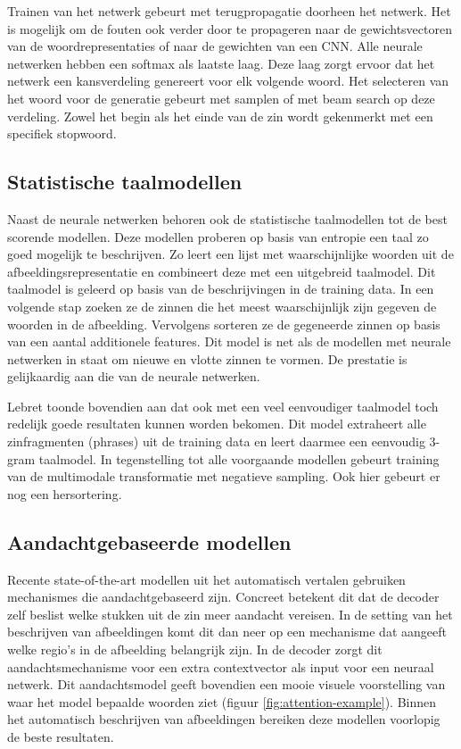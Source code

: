Trainen van het netwerk gebeurt met terugpropagatie doorheen het netwerk. Het is mogelijk om de fouten ook verder door te propageren naar de gewichtsvectoren van de woordrepresentaties of naar de gewichten van een CNN.
Alle neurale netwerken hebben een softmax als laatste laag. Deze laag zorgt ervoor dat het netwerk een kansverdeling genereert voor elk volgende woord.
Het selecteren van het woord voor de generatie gebeurt met samplen of met beam search op deze verdeling. Zowel het begin als het einde van de zin wordt gekenmerkt met een specifiek stopwoord.

\subsection{Statistische taalmodellen}
Naast de neurale netwerken behoren ook de statistische taalmodellen tot de best scorende modellen.
Deze modellen proberen op basis van entropie een taal zo goed mogelijk te beschrijven. Zo leert \cite{Fang} een lijst met waarschijnlijke woorden uit de afbeeldingsrepresentatie en combineert deze met een uitgebreid taalmodel. Dit taalmodel is geleerd op basis van de beschrijvingen in de training data. In een volgende stap zoeken ze de zinnen die het meest waarschijnlijk zijn gegeven de woorden in de afbeelding. Vervolgens sorteren ze de gegeneerde zinnen op basis van een aantal additionele features. Dit model is net als de modellen met neurale netwerken in staat om nieuwe en vlotte zinnen te vormen. De prestatie is gelijkaardig aan die van de neurale netwerken.

Lebret \cite{Lebret} toonde bovendien aan dat ook met een veel eenvoudiger taalmodel toch redelijk goede resultaten kunnen worden bekomen. Dit model extraheert alle zinfragmenten (phrases) uit de training data en leert daarmee een eenvoudig 3-gram taalmodel. In tegenstelling tot alle voorgaande modellen gebeurt training van de multimodale transformatie met negatieve sampling. Ook hier gebeurt er nog een hersortering.

\subsection{Aandachtgebaseerde modellen}
Recente state-of-the-art modellen uit het automatisch vertalen gebruiken mechanismes die aandachtgebaseerd zijn. Concreet betekent dit dat de decoder zelf beslist welke stukken uit de zin meer aandacht vereisen.
In de setting van het beschrijven van afbeeldingen komt dit dan neer op een mechanisme dat aangeeft welke regio's in de afbeelding belangrijk zijn. In de decoder zorgt dit aandachtsmechanisme voor een extra contextvector als input voor een neuraal netwerk. Dit aandachtsmodel geeft bovendien een mooie visuele voorstelling van waar het model bepaalde woorden ziet (figuur \ref{fig:attention-example}). Binnen het automatisch beschrijven van afbeeldingen bereiken deze modellen  voorlopig de beste resultaten.


